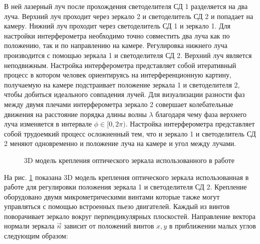 В ней лазерный луч после прохождения светоделителя СД 1 разделяется на два луча. Верхний луч проходит через зеркало 2 и светоделитель СД 2 и попадает на камеру. Нижний луч проходит через светоделитель СД 1 и зеркало 1. Для настройки интерферометра необходимо точно совместить два луча как по положению, так и по направлению на камере. Регулировка нижнего луча производится с помощью зеркала 1 и светоделителя СД 2. Верхний луч является неподвижным. Настройка интерферометра представляет собой итеративный процесс в котором человек ориентируясь на интерференционную картину, получаемую на камере подстраивает положение зеркала 1 и светоделителя 2, чтобы добиться идеального совпадения лучей. Для визуализации разности фаз между двумя плечами интерферометра зеркало 2 совершает колебательные движения на расстояние порядка длины волны $\lambda$ благодаря чему фаза верхнего луча изменяется в интервале $\phi \in [0, 2\pi)$. Настройка интерферометра представляет собой трудоемкий процесс осложненный тем, что и зеркало 1 и светоделитель СД 2 меняют одновременно и положение луча на камере и угол между лучами. 

\begin{figure}[ht]
\caption{3D модель крепления оптического зеркала использованного в работе \cite{newport_mirror}}
\label{fig:mirror}
\end{figure}

На рис. \ref{fig:mirror} показана 3D модель крепления оптического зеркала использованная в работе для регулировки положения зеркала 1 и светоделителя СД 2. Крепление оборудовано двумя микрометрическими винтами которые также могут управляться с помощью встроенных пьезо двигателей. Каждый из винтов поворачивает зеркало вокруг перпендикулярных плоскостей. Направление вектора нормали зеркала $\vec{n}$ зависит от положений винтов $x, y$ в приближении малых углов следующим образом: 

